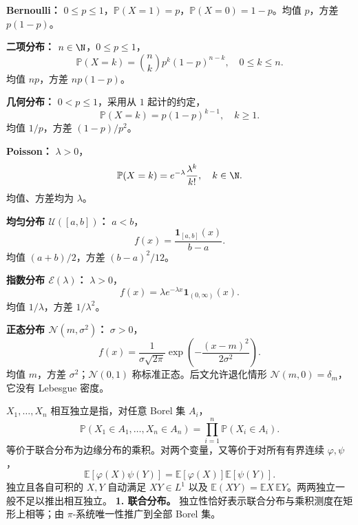 \textbf{Bernoulli：} $0\le p\le1$，$\mathbb P(X=1)=p$，$\mathbb P(X=0)=1-p$。均值 $p$，方差 $p(1-p)$。

\textbf{二项分布：} $n\in\N$，$0\le p\le1$，
\[
\mathbb P(X=k)=\binom nk p^k(1-p)^{n-k},
\quad 0\le k\le n.
\]
均值 $np$，方差 $np(1-p)$。

\textbf{几何分布：} $0<p\le1$，采用从 $1$ 起计的约定，
\[
\mathbb P(X=k)=p(1-p)^{k-1},\quad k\ge1.
\]
均值 $1/p$，方差 $(1-p)/p^2$。

\textbf{Poisson：} $\lambda>0$，
\[
\mathbb P(X=k)=e^{-\lambda}\frac{\lambda^k}{k!},
\quad k\in\N.
\]
均值、方差均为 $\lambda$。

\textbf{均匀分布 $\mathcal U([a,b])$：} $a<b$，
\[
f(x)=\frac{\mathbf1_{[a,b]}(x)}{b-a}.
\]
均值 $(a+b)/2$，方差 $(b-a)^2/12$。

\textbf{指数分布 $\mathcal E(\lambda)$：} $\lambda>0$，
\[
f(x)=\lambda e^{-\lambda x}\mathbf1_{(0,\infty)}(x).
\]
均值 $1/\lambda$，方差 $1/\lambda^2$。

\textbf{正态分布 $\mathcal N(m,\sigma^2)$：} $\sigma>0$，
\[
f(x)=\frac{1}{\sigma\sqrt{2\pi}}
\exp\!\left(-\frac{(x-m)^2}{2\sigma^2}\right).
\]
均值 $m$，方差 $\sigma^2$；$\mathcal N(0,1)$ 称标准正态。后文允许退化情形 $\mathcal N(m,0)=\delta_m$，它没有 Lebesgue 密度。

$X_1,\ldots,X_n$ 相互独立是指，对任意 Borel 集 $A_i$，
\[
\mathbb P(X_1\in A_1,\ldots,X_n\in A_n)
=\prod_{i=1}^n\mathbb P(X_i\in A_i).
\]
等价于联合分布为边缘分布的乘积。对两个变量，又等价于对所有有界连续 $\varphi,\psi$，
\[
\mathbb E[\varphi(X)\psi(Y)]
=\mathbb E[\varphi(X)]\mathbb E[\psi(Y)].
\]
独立且各自可积的 $X,Y$ 自动满足 $XY\in L^1$ 以及 $\mathbb E(XY)=\mathbb EX\,\mathbb EY$。两两独立一般不足以推出相互独立。
\textbf{1. 联合分布。} 独立性恰好表示联合分布与乘积测度在矩形上相等；由 $\pi$-系统唯一性推广到全部 Borel 集。

